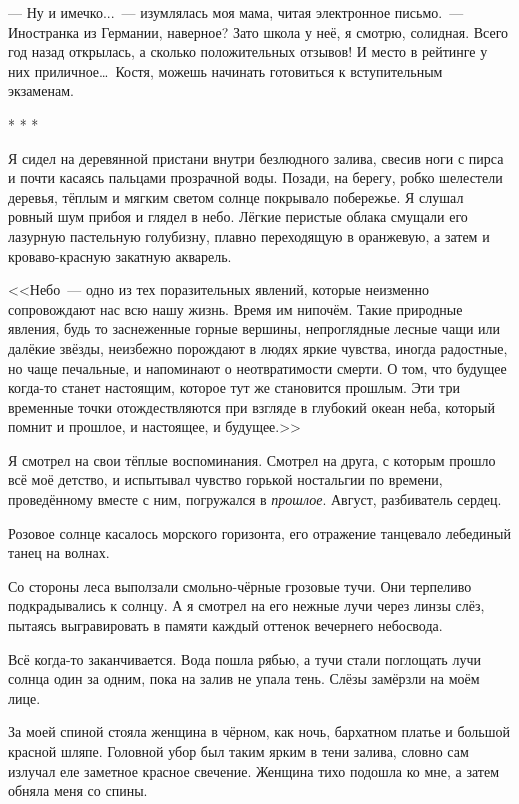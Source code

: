 \documentclass[openany, oneside]{book}
\begin{document}
--- Ну и имечко...~--- изумлялась моя мама, читая электронное письмо.~--- Иностранка из Германии, наверное? Зато школа у неё, я смотрю, солидная. Всего год назад открылась, а сколько положительных отзывов! И место в рейтинге у них приличное\dots \ Костя, можешь начинать готовиться к вступительным экзаменам.

\begin{center}
    * * *
\end{center}

Я сидел на деревянной пристани внутри безлюдного залива, свесив ноги с пирса и почти касаясь пальцами прозрачной воды. Позади, на берегу, робко шелестели деревья, тёплым и мягким светом солнце покрывало побережье. Я слушал ровный шум прибоя и глядел в небо. Лёгкие перистые облака смущали его лазурную пастельную голубизну, плавно переходящую в оранжевую, а затем и кроваво-красную закатную акварель. 

<<Небо~--- одно из тех поразительных явлений, которые неизменно сопровождают нас всю нашу жизнь. Время им нипочём. Такие природные явления, будь то заснеженные горные вершины, непроглядные лесные чащи или далёкие звёзды, неизбежно порождают в людях яркие чувства, иногда радостные, но чаще печальные, и напоминают о неотвратимости смерти. О том, что будущее когда-то станет настоящим, которое тут же становится прошлым. Эти три временные точки отождествляются при взгляде в глубокий океан неба, который помнит и прошлое, и настоящее, и будущее.>>

Я смотрел на свои тёплые воспоминания. Смотрел на друга, с которым прошло всё моё детство, и испытывал чувство горькой ностальгии по времени, проведённому вместе с ним, погружался в \textit{прошлое}. Август, разбиватель сердец.

Розовое солнце касалось морского горизонта, его отражение танцевало лебединый танец на волнах.

Со стороны леса выползали смольно-чёрные грозовые тучи. Они терпеливо подкрадывались к солнцу. А я смотрел на его нежные лучи через линзы слёз, пытаясь выгравировать в памяти каждый оттенок вечернего небосвода.

Всё когда-то заканчивается. Вода пошла рябью, а тучи стали поглощать лучи солнца один за одним, пока на залив не упала тень. Слёзы замёрзли на моём лице.

За моей спиной стояла женщина в чёрном, как ночь, бархатном платье и большой красной шляпе. Головной убор был таким ярким в тени залива, словно сам излучал еле заметное красное свечение. Женщина тихо подошла ко мне, а затем обняла меня со спины.
\end{document}

